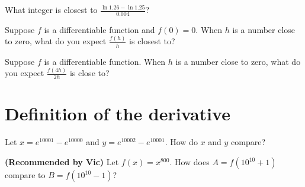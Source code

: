 \documentclass{ximera}
\newcommand{\recommendation}[1]{\textbf{(Recommended by #1)}}
\begin{document}
\begin{problem}
  What integer is closest to $\frac{\ln 1.26 - \ln 1.25}{0.004}$?
  \begin{multipleChoice}
  \end{multipleChoice}
\end{problem}

\begin{problem}
  Suppose $f$ is a differentiable function and $f(0) = 0$.  When $h$
  is a number close to zero, what do you expect $\frac{f(h)}{h}$ is
  closest to?
  \begin{multipleChoice}
  \end{multipleChoice}
\end{problem}

\begin{problem}
  Suppose $f$ is a differentiable function.  When $h$ is a number
  close to zero, what do you expect $\frac{f(4h)}{2h}$ is close to?
  \begin{multipleChoice}
  \end{multipleChoice}
\end{problem}

\clearpage

\section{Definition of the derivative}

\begin{problem}
  Let $x = e^{10001} - e^{10000}$ and $y = e^{10002} - e^{10001}$.  How do $x$ and $y$ compare?
  \begin{multipleChoice}
  \end{multipleChoice}
\end{problem}

\begin{problem}
\recommendation{Vic}
  Let $f(x) = x^{800}$.  How does $A = f(10^{10} + 1)$ compare to $B = f(10^{10} - 1)$?
  \begin{multipleChoice}
  \end{multipleChoice}
\end{problem}
\end{document}
